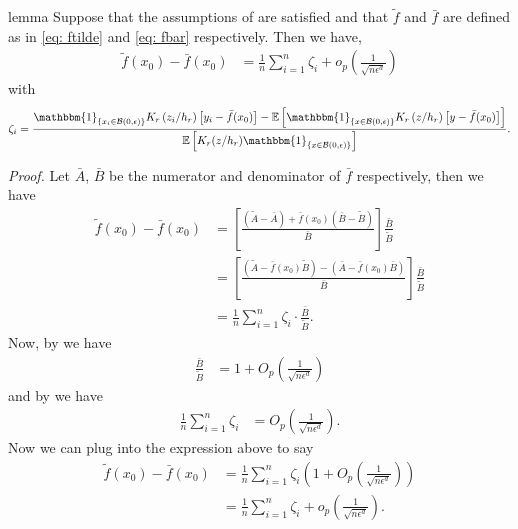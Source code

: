 \documentclass[11pt]{article}
\begin{document}
\begin{appendices}
\begin{restatable}{lemma}{} \label{lemma: ftilde minus fbar}
    Suppose that the assumptions of  are satisfied and that $\tilde{f}$ and $\bar{f}$ are defined as in \cref{eq: ftilde} and \cref{eq: fbar} respectively. Then we have,
    \begin{align*}
        \tilde{f}(x_0) - \bar{f}(x_0) &= \frac{1}{n}\sum_{i = 1}^n\zeta_i + o_p\left(\frac{1}{\sqrt{n\epsilon^{d}}}\right) 
    \end{align*}
    with 
    \begin{equation}
        \zeta_i = \frac{\mathbbm{1}_{\{x_i \in \mathcal{B}(0, \epsilon)\}}K_r\left(z_i/h_r\right)\left[y_i - \bar{f}(x_0)\right] - \mathbb{E}\left[\mathbbm{1}_{\{x \in \mathcal{B}(0, \epsilon)\}}K_r\left(z/h_r\right)\left[y - \bar{f}(x_0)\right]\right]}{\mathbb{E}\left[K_r(z/h_r)\mathbbm{1}_{\{x\in \mathcal{B}(0, \epsilon)\}}\right]}. \label{eq: zeta definition}
    \end{equation}
\end{restatable}
\noindent \textit{Proof.} Let $\bar{A}$, $\bar{B}$ be the numerator and denominator of $\bar{f}$ respectively, then we have
\begin{align*}
    \tilde{f}(x_0) - \bar{f}(x_0) &=  \left[\frac{(\tilde{A}-\bar{A}) + \bar{f}(x_0)\left(\bar{B} - \tilde{B}\right)}{\bar{B}}\right]\frac{\bar{B}}{\tilde{B}} \\
    &= \left[\frac{\left(\tilde{A} - \bar{f}(x_0)\tilde{B}\right)- \left(\bar{A} - \bar{f}(x_0)\bar{B}\right)}{\bar{B}}\right]\frac{\bar{B}}{\tilde{B}} \\
    &= \frac{1}{n}\sum_{i = 1}^n\zeta_i\cdot \frac{\bar{B}}{\tilde{B}}.
\end{align*}
Now, by  we have
\begin{align*}
    \frac{\bar{B}}{\tilde{B}} &= 1 + O_p\left(\frac{1}{\sqrt{n\epsilon^d}}\right)
\end{align*}
and by  we have
\begin{align*}
     \frac{1}{n} \sum_{i = 1}^n \zeta_i&=  O_p\left(\frac{1}{\sqrt{n\epsilon^d}}\right).
\end{align*}
Now we can plug into the expression above to say
\begin{align*}
    \tilde{f}(x_0) - \bar{f}(x_0) &= \frac{1}{n}\sum_{i = 1}^n\zeta_i\left(1 + O_p\left(\frac{1}{\sqrt{n\epsilon^d}}\right)\right) \\
    &= \frac{1}{n}\sum_{i = 1}^n\zeta_i + o_p\left(\frac{1}{\sqrt{n\epsilon^d}}\right). \label{eq: ftilde fbar decomp}
\end{align*}


\end{appendices}
\end{document}
